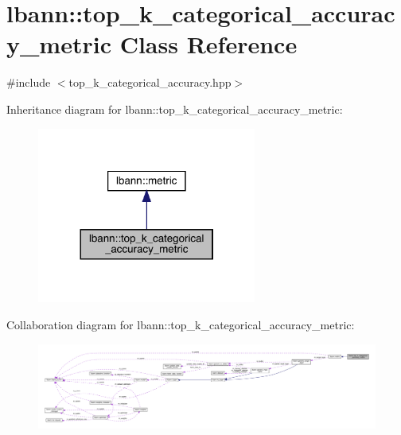 \hypertarget{classlbann_1_1top__k__categorical__accuracy__metric}{}\section{lbann\+:\+:top\+\_\+k\+\_\+categorical\+\_\+accuracy\+\_\+metric Class Reference}
\label{classlbann_1_1top__k__categorical__accuracy__metric}


{\ttfamily \#include $<$top\+\_\+k\+\_\+categorical\+\_\+accuracy.\+hpp$>$}



Inheritance diagram for lbann\+:\+:top\+\_\+k\+\_\+categorical\+\_\+accuracy\+\_\+metric\+:\nopagebreak
\begin{figure}[H]
\begin{center}
\leavevmode
\includegraphics[width=204pt]{classlbann_1_1top__k__categorical__accuracy__metric__inherit__graph}
\end{center}
\end{figure}


Collaboration diagram for lbann\+:\+:top\+\_\+k\+\_\+categorical\+\_\+accuracy\+\_\+metric\+:\nopagebreak
\begin{figure}[H]
\begin{center}
\leavevmode
\includegraphics[width=350pt]{classlbann_1_1top__k__categorical__accuracy__metric__coll__graph}
\end{center}
\end{figure}
